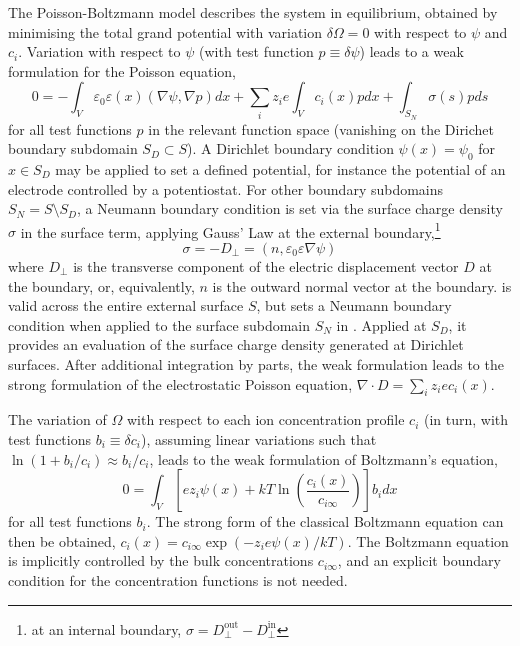 The Poisson-Boltzmann model describes the system in equilibrium,
obtained by minimising the total grand potential with variation
$\delta\Omega=0$ with respect to $\psi$ and $c_i$. Variation with
respect to $\psi$ (with test function $p \equiv \delta \psi$) leads to a weak formulation
for the Poisson equation,
\begin{equation}
    0 = -\int_{V} \varepsilon_{0}\varepsilon(x) (\nabla\psi,\nabla p) dx + \sum_{i}z_i e \int_{V} c_{i}(x) p dx + \int_{S_{N}} \sigma(s) p ds
    \label{weak_Poisson}
\end{equation}
for all test functions $p$ in the relevant function space (vanishing
on the Dirichet boundary subdomain $S_{D} \subset S$).  A Dirichlet boundary
condition $\psi(x)=\psi_{0}$ for $x \in S_{D}$ may be applied to set a defined potential,
for instance the potential of an  electrode controlled by a
potentiostat. For other boundary subdomains $S_{N} = S \setminus
S_{D}$, a Neumann boundary condition is set via the surface
charge density $\sigma$ in the surface term, applying Gauss' Law at
the external boundary,\footnote{at an internal boundary, $\sigma=D^{\text{out}}_{\perp}-D^{\text{in}}_{\perp}$}
\begin{equation}
  \sigma = -D_{\perp} = (n, \varepsilon_{0}\varepsilon\nabla \psi)
  \label{surface_charge_gauss}
\end{equation}
where $D_{\perp}$ is the transverse component of the electric
displacement vector $D$ at the boundary, or, equivalently, $n$ is the
outward normal vector at the boundary. 
is valid across the entire  external surface $S$, but sets a Neumann
boundary condition when applied to the surface subdomain
$S_{N}$ in . Applied at $S_{D}$, it provides an
evaluation of the surface charge density generated at Dirichlet surfaces.
 After additional
integration by parts, the weak formulation  leads to the strong
formulation of the electrostatic Poisson equation,
$\nabla\cdot D = \sum_i z_i e c_{i}(x)$.

The variation of $\Omega$ with
respect to each ion concentration profile $c_i$ (in turn, with test
functions $b_i\equiv \delta c_i$), assuming linear variations such that
$\ln(1+b_i/c_i)\approx b_i/c_i$, leads to the weak formulation of Boltzmann's
equation,
\begin{equation}
    0 = \int_{V} \left[ e z_i \psi(x)
    + kT \ln\left(\frac{c_i(x)}{c_{i\infty}}\right)
  \right] b_i dx
    \label{weak_Boltzmann}
\end{equation}
for all test functions $b_i$. The strong form of the classical
Boltzmann equation can then be obtained, $c_i(x)=c_{i\infty}\exp(-z_i
e \psi(x)/kT)$.  The Boltzmann equation is implicitly controlled by
the bulk concentrations $c_{i\infty}$, and an explicit boundary condition
for the concentration functions is not needed.

